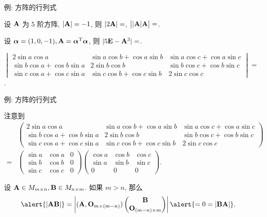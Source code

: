 \begin{frame}{例: 方阵的行列式}
	\onslide<+->
	\begin{exercise}
		设 ${\mathbf{A}}$ 为 $5$ 阶方阵, $|{\mathbf{A}}|=-1$, 则
		$|2{\mathbf{A}}|=$,
		$\bigl||{\mathbf{A}}|{\mathbf{A}}\bigr|=$.
	\end{exercise}
	\onslide<+->
	\begin{exercise}
		设 ${\boldsymbol{\alpha}}=(1,0,-1),{\mathbf{A}}={\boldsymbol{\alpha}}^{\mathrm{T}}{\boldsymbol{\alpha}}$, 则
		$|5{\mathbf{E}}-{\mathbf{A}}^3|=$\fillblank{\visible<+->{$-75$}}.
	\end{exercise}
	\onslide<+->
	\begin{exercise}
		$\begin{vmatrix}
			2\sin a\cos a&\sin a\cos b+\cos a\sin b&\sin a\cos c+\cos a\sin c\\
			\sin b\cos a+\cos b\sin a&2\sin b\cos b&\sin b\cos c+\cos b\sin c\\
			\sin c\cos a+\cos c\sin a&\sin c\cos b+\cos c\sin b&2\sin c\cos c
		\end{vmatrix}=$\fillblank{\visible<+->{$0$}}.
	\end{exercise}
\end{frame}

\begin{frame}{例: 方阵的行列式}
	\onslide<+->
	\begin{answer}
		注意到
		\begin{align*}
			&\begin{pmatrix}
			2\sin a\cos a&\sin a\cos b+\cos a\sin b&\sin a\cos c+\cos a\sin c\\
			\sin b\cos a+\cos b\sin a&2\sin b\cos b&\sin b\cos c+\cos b\sin c\\
			\sin c\cos a+\cos c\sin a&\sin c\cos b+\cos c\sin b&2\sin c\cos c
		\end{pmatrix}\\=&\begin{pmatrix}
			\sin a&\cos a&0\\
			\sin b&\cos b&0\\
			\sin c&\cos c&0
		\end{pmatrix}\begin{pmatrix}
			\cos a&\cos b&\cos c\\
			\sin a&\sin b&\sin c\\
			0&0&0
		\end{pmatrix}.
	\end{align*}
	\end{answer}
	\onslide<+->
	设 ${\mathbf{A}}\in M_{m\times n},{\mathbf{B}}\in M_{n\times m}$.
	\onslide<+->
	如果 $m>n$, 那么
	\[\alert{|\bfA\bfB|}=\left|
		(\bfA,\bfO_{m\times(m-n)})\begin{pmatrix}
		\bfB\\\bfO_{(m-n)\times m}
	\end{pmatrix}\right|\alert{=0=|\bfB\bfA|}.\]
\end{frame}


